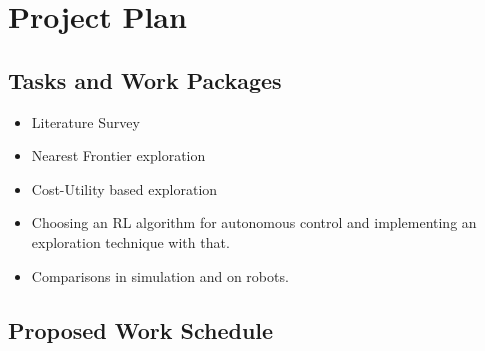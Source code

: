 \section{Project Plan}
\subsection{Tasks and Work Packages}
\begin{itemize}
\item Literature Survey
\item Nearest Frontier exploration
\item Cost-Utility based exploration
\item Choosing an RL algorithm for autonomous control and implementing an exploration technique with
 that.
\item Comparisons in simulation and on robots.
\end{itemize}
\pagebreak
\subsection{Proposed Work Schedule}

\pagebreak
